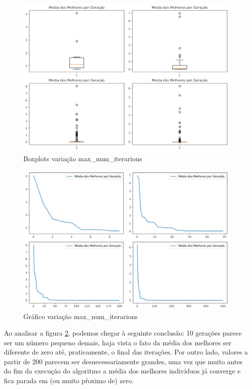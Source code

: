 \documentclass[12pt]{article}
\begin{document}
	
	\begin{figure}[H]
		\centering
		\includegraphics[width=0.9\linewidth]{Imagens/maxnumiteration/boxplotMaxNumIt}
		\caption{Boxplots variação max\_num\_iterarions}
		\label{fig:boxplotmaxnumit}
	\end{figure}
	\begin{figure}[H]
		\centering
		\includegraphics[width=0.9\linewidth]{Imagens/maxnumiteration/graficoMaxNumIt}
		\caption{Gráfico variação max\_num\_iterarions}
		\label{fig:graficomaxnumit}
	\end{figure}
	
	Ao analisar a figura \ref{fig:graficomaxnumit}, podemos chegar à seguinte conclusão: 10 gerações parece ser um número pequeno demais,  haja vista o fato da média dos melhores ser diferente de zero até, praticamente, o final das iterações. Por outro lado, valores a partir de 200 parecem ser desnecessariamente grandes, uma vez que muito antes do fim da execução do algoritmo a média dos melhores indivíduos já converge e fica parada em (ou muito pŕoximo de) zero.
	
\end{document}
